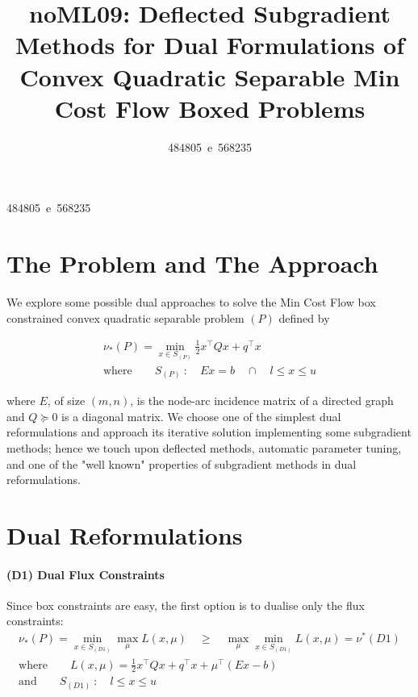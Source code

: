 \documentclass[10pt,twoside,book,a5paper]{ncc}
\begin{document}
\title{noML09: Deflected Subgradient Methods for Dual Formulations of Convex Quadratic Separable Min Cost Flow Boxed Problems}
\author{484805~e~568235}{484805~e~568235}
\maketitle


\section*{The Problem and The Approach}

We explore some possible dual approaches to solve the Min Cost Flow box constrained convex quadratic separable problem $(P)$ defined by

\begin{gather*}
\nu_*(P) = \min_{x \in S_{(P)}} \frac{1}{2} x^\intercal Q x + q^\intercal x \\
\textrm{where} \qquad S_{(P)} \: :\quad E x = b \quad \cap \quad l \le x \le u
\end{gather*}

where $E$, of size $(m, n)$, is the node-arc incidence matrix of a directed graph and $Q\succcurlyeq 0$ is a diagonal matrix.
We choose one of the simplest dual reformulations and approach its iterative solution implementing some subgradient methods; hence we touch upon deflected methods, automatic parameter tuning, and one of the "well known" properties of subgradient methods in dual reformulations.

\section{Dual Reformulations}
\label{base-section}

\paragraph{(D1) Dual Flux Constraints}
Since box constraints are easy, the first option is to dualise only the flux constraints:
\begin{gather*}
    \nu_*(P) = \min_{x \in S_{(D1)}} \max_{\mu} L(x, \mu) \quad\ge\quad \max_{\mu} \min_{x \in S_{(D1)}} L(x, \mu) = \nu^*(D1)  \\
   \textrm{where}\qquad  L(x, \mu) = \frac{1}{2} x^\intercal Q x + q^\intercal x + \mu^\intercal (E x - b)  \\
    \textrm{and}\qquad  S_{(D1)} \: :\quad l \le x \le u
\end{gather*}
\end{document}

